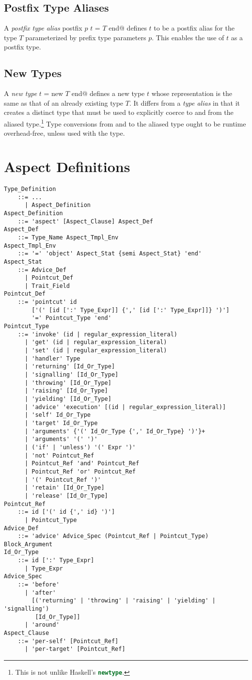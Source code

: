 \subsection{Postfix Type Aliases}
A {\em postfix type alias} \lstinline@type postfix $p$ $t$ = $T$ end@ defines $t$ to be a postfix alias for the type $T$ parameterized by prefix type parameters $p$. This enables the use of $t$ as a postfix type.

\subsection{New Types}
A {\em new type} \lstinline@type $t$ = new $T$ end@ defines a new type $t$ whose representation is the same as that of an already existing type $T$. It differs from a {\em type alias} in that it creates a distinct type that must be used to explicitly coerce to and from the aliased type.\footnote{This is not unlike Haskell's \lstinline[language=Haskell]@newtype@.} Type conversions from and to the aliased type ought to be runtime overhead-free, unless used with the  type.






\section{Aspect Definitions}
\label{sec:aspects}

\grammar\begin{lstlisting}
Type_Definition 
    ::= ...
      | Aspect_Definition
Aspect_Definition 
    ::= 'aspect' [Aspect_Clause] Aspect_Def
Aspect_Def
    ::= Type_Name Aspect_Tmpl_Env
Aspect_Tmpl_Env 
    ::= '=' 'object' Aspect_Stat {semi Aspect_Stat} 'end'
Aspect_Stat 
    ::= Advice_Def
      | Pointcut_Def
      | Trait_Field
Pointcut_Def 
    ::= 'pointcut' id
        ['(' [id [':' Type_Expr]] {',' [id [':' Type_Expr]]} ')']
        '=' Pointcut_Type 'end'
Pointcut_Type 
    ::= 'invoke' (id | regular_expression_literal)
      | 'get' (id | regular_expression_literal)
      | 'set' (id | regular_expression_literal)
      | 'handler' Type
      | 'returning' [Id_Or_Type]
      | 'signalling' [Id_Or_Type]
      | 'throwing' [Id_Or_Type]
      | 'raising' [Id_Or_Type]
      | 'yielding' [Id_Or_Type]
      | 'advice' 'execution' [(id | regular_expression_literal)]
      | 'self' Id_Or_Type
      | 'target' Id_Or_Type
      | 'arguments' {'(' Id_Or_Type {',' Id_Or_Type} ')'}+
      | 'arguments' '(' ')'
      | ('if' | 'unless') '(' Expr ')'
      | 'not' Pointcut_Ref
      | Pointcut_Ref 'and' Pointcut_Ref
      | Pointcut_Ref 'or' Pointcut_Ref
      | '(' Pointcut_Ref ')'
      | 'retain' [Id_Or_Type]
      | 'release' [Id_Or_Type]
Pointcut_Ref 
    ::= id ['(' id {',' id} ')'] 
      | Pointcut_Type
Advice_Def 
    ::= 'advice' Advice_Spec (Pointcut_Ref | Pointcut_Type) Block_Argument
Id_Or_Type
    ::= id [':' Type_Expr] 
      | Type_Expr
Advice_Spec 
    ::= 'before' 
      | 'after' 
        [('returning' | 'throwing' | 'raising' | 'yielding' | 'signalling') 
         [Id_Or_Type]]
      | 'around'
Aspect_Clause
    ::= 'per-self' [Pointcut_Ref] 
      | 'per-target' [Pointcut_Ref] 
\end{lstlisting}

